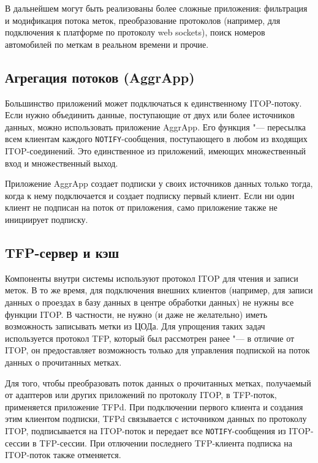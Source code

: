 В дальнейшем могут быть реализованы более сложные приложения: фильтрация и модификация потока меток, преобразование протоколов (например, для подключения к платформе по протоколу web sockets), поиск номеров автомобилей по меткам в реальном времени и прочие.


\subsection{Агрегация потоков (AggrApp)}

Большинство приложений может подключаться к единственному ITOP-потоку. Если нужно объединить данные, поступающие от двух или более источников данных, можно использовать приложение AggrApp. Его функция "--- пересылка всем клиентам каждого \texttt{NOTIFY}-сообщения, поступающего в любом из входящих ITOP-соединений. Это единственное из приложений, имеющих множественный вход и множественный выход.

Приложение AggrApp создает подписки у своих источников данных только тогда, когда к нему подключается и создает подписку первый клиент. Если ни один клиент не подписан на поток от приложения, само приложение также не инициирует подписку.


\subsection{TFP-сервер и кэш}

Компоненты внутри системы используют протокол ITOP для чтения и записи меток. В то же время, для подключения внешних клиентов (например, для записи данных о проездах в базу данных в центре обработки данных) не нужны все функции ITOP. В частности, не нужно (и даже не желательно) иметь возможность записывать метки из ЦОДа. Для упрощения таких задач используется протокол TFP, который был рассмотрен ранее "--- в отличие от ITOP, он предоставляет возможность только для управления подпиской на поток данных о прочитанных метках.

Для того, чтобы преобразовать поток данных о прочитанных метках, получаемый от адаптеров или других приложений по протоколу ITOP, в TFP-поток, применяется приложение TFPd. При подключении первого клиента и создания этим клиентом подписки, TFPd связывается с источником данных по протоколу ITOP, подписывается на ITOP-поток и передает все \texttt{NOTIFY}-сообщения из ITOP-сессии в TFP-сессии. При отлючении последнего TFP-клиента подписка на ITOP-поток также отменяется.


